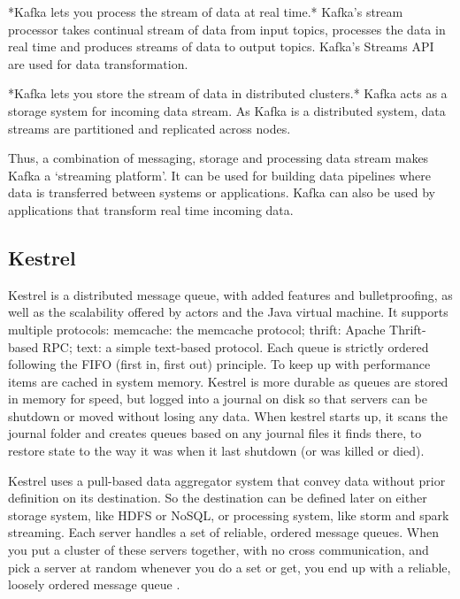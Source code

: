      *Kafka lets you process the stream of data at real time.* Kafka’s
     stream processor takes continual stream of data from input
     topics, processes the data in real time and produces streams of
     data to output topics. Kafka’s Streams API are used for data
     transformation.

     *Kafka lets you store the stream of data in distributed
     clusters.* Kafka acts as a storage system for incoming data
     stream. As Kafka is a distributed system, data streams are
     partitioned and replicated across nodes.

     Thus, a combination of messaging, storage and processing data
     stream makes Kafka a ‘streaming platform’. It can be used for
     building data pipelines where data is transferred between systems
     or applications. Kafka can also be used by applications that
     transform real time incoming data. \cite{www-kafka}

\subsection{ Kestrel}
     
     Kestrel is a distributed message queue, with added features and
     bulletproofing, as well as the scalability offered by actors and
     the Java virtual machine. It supports multiple protocols:
     memcache: the memcache protocol; thrift: Apache Thrift-based RPC;
     text: a simple text-based protocol. Each queue is strictly
     ordered following the FIFO (first in, first out) principle. To
     keep up with performance items are cached in system
     memory. Kestrel is more durable as queues are stored in memory
     for speed, but logged into a journal on disk so that servers can
     be shutdown or moved without losing any data. When kestrel starts
     up, it scans the journal folder and creates queues based on any
     journal files it finds there, to restore state to the way it was
     when it last shutdown (or was killed or died).

     Kestrel uses a pull-based data aggregator system that convey data
     without prior definition on its destination. So the destination
     can be defined later on either storage system, like HDFS or
     NoSQL, or processing system, like storm and spark
     streaming. Each server handles a set of reliable, ordered message
     queues. When you put a cluster of these servers together, with no
     cross communication, and pick a server at random whenever you do
     a set or get, you end up with a reliable, loosely ordered message
     queue \cite{git-kestrel}.

